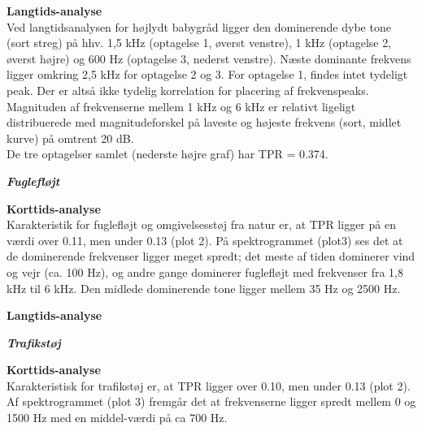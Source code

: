 
\newpage
\textbf{Langtids-analyse} \\
Ved langtidsanalysen for højlydt babygråd ligger den dominerende dybe tone (sort streg) på hhv. 1,5 kHz (optagelse 1, øverst venstre), 1 kHz (optagelse 2, øverst højre) og 600 Hz (optagelse 3, nederst venstre). Næste dominante frekvens ligger omkring 2,5 kHz for optagelse 2 og 3. For optagelse 1, findes intet tydeligt peak. Der er altså ikke tydelig korrelation for placering af frekvenspeaks. Magnituden af frekvenserne mellem 1 kHz og 6 kHz er relativt ligeligt distribuerede med magnitudeforskel på laveste og højeste frekvens (sort, midlet kurve) på omtrent 20 dB. \\
De tre optagelser samlet (nederste højre graf) har TPR = 0.374.


\newpage
\begin{center} \textit{\textbf{Fuglefløjt}} \end{center}
\textbf{Korttids-analyse} \\
Karakteristik for fuglefløjt og omgivelsesstøj fra natur er, at TPR ligger på en værdi over 0.11, men under 0.13 (plot 2). På spektrogrammet (plot3) ses det at de dominerende frekvenser ligger meget spredt; det meste af tiden dominerer vind og vejr (ca. 100 Hz), og andre gange dominerer fuglefløjt med frekvenser fra 1,8 kHz til 6 kHz. Den midlede dominerende tone ligger mellem 35 Hz og 2500 Hz.


\newpage
\textbf{Langtids-analyse} \\

\newpage
\begin{center}\textit{\textbf{Trafikstøj}}\end{center}
\textbf{Korttids-analyse} \\
Karakteristisk for trafikstøj er, at TPR ligger over 0.10, men under 0.13 (plot 2). Af spektrogrammet (plot 3) fremgår det at frekvenserne ligger spredt mellem 0 og 1500 Hz med en middel-værdi på ca 700 Hz.

